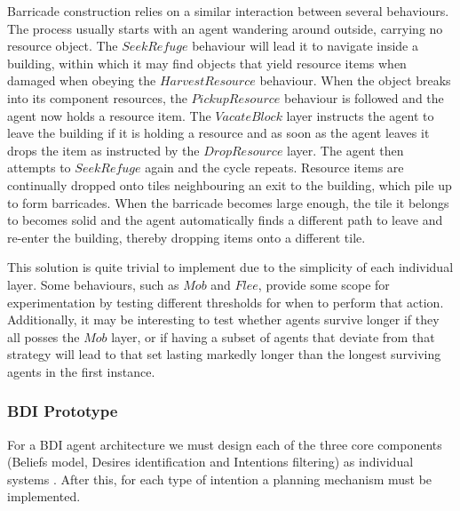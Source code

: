 \documentclass[12pt,a4paper]{article}
\begin{document}
Barricade construction relies on a similar interaction between several behaviours. The process usually starts with an agent wandering around outside, carrying no resource object. The $SeekRefuge$ behaviour will lead it to navigate inside a building, within which it may find objects that yield resource items when damaged when obeying the $HarvestResource$ behaviour. When the object breaks into its component resources, the $PickupResource$ behaviour is followed and the agent now holds a resource item. The $VacateBlock$ layer instructs the agent to leave the building if it is holding a resource and as soon as the agent leaves it drops the item as instructed by the $DropResource$ layer. The agent then attempts to $SeekRefuge$ again and the cycle repeats. Resource items are continually dropped onto tiles neighbouring an exit to the building, which pile up to form barricades. When the barricade becomes large enough, the tile it belongs to becomes solid and the agent automatically finds a different path to leave and re-enter the building, thereby dropping items onto a different tile.

This solution is quite trivial to implement due to the simplicity of each individual layer. Some behaviours, such as $Mob$ and $Flee$, provide some scope for experimentation by testing different thresholds for when to perform that action. Additionally, it may be interesting to test whether agents survive longer if they all posses the $Mob$ layer, or if having a subset of agents that deviate from that strategy will lead to that set lasting markedly longer than the longest surviving agents in the first instance.

\subsubsection{BDI Prototype}\noindent
For a BDI agent architecture we must design each of the three core components (Beliefs model, Desires identification and Intentions filtering) as individual systems \cite{rao95}. After this, for each type of intention a planning mechanism must be implemented.
\end{document}
